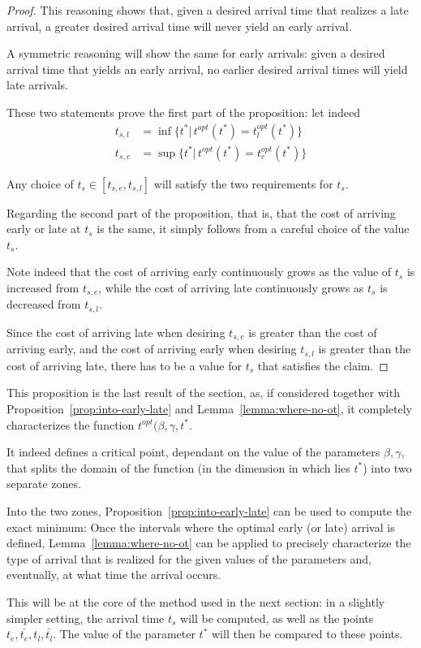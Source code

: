 \begin{proof}
  This reasoning shows that, given a desired arrival time that realizes a late arrival,
  a greater desired arrival time will never yield an early arrival.

  A symmetric reasoning will show the same for early arrivals:
  given a desired arrival time that yields an early arrival,
  no earlier desired arrival times will yield late arrivals.

  These two statements prove the first part of the proposition:
  let indeed
  \begin{align*}
    t_{s, l} & = \inf\{t^* |\, t^{opt}(t^*) = t_l^{opt}(t^*)\} \\
    t_{s, e} & = \sup\{t^* |\, t^{opt}(t^*) = t_e^{opt}(t^*)\}
  \end{align*}

  Any choice of \(t_s \in [t_{s, e}, t_{s, l}]\) will satisfy the two requirements for \(t_s\).

  Regarding the second part of the proposition,
  that is, that the cost of arriving early or late at \(t_s\) is the same,
  it simply follows from a careful choice of the value \(t_s\).

  Note indeed that the cost of arriving early continuously grows as the value of \(t_s\) is increased from \(t_{s, e}\),
  while the cost of arriving late continuously grows as \(t_s\) is decreased from \(t_{s, l}\).

  Since the cost of arriving late when desiring \(t_{s, e}\) is greater than the cost of arriving early,
  and the cost of arriving early when desiring \(t_{s, l}\) is greater than the cost of arriving late,
  there has to be a value for \(t_s\) that satisfies the claim.
\end{proof}

This proposition is the last result of the section,
as, if considered together with Proposition~\ref{prop:into-early-late} and Lemma~\ref{lemma:where-no-ot},
it completely characterizes the function \(t^{opt}(\beta, \gamma, t^*\).

It indeed defines a critical point,
dependant on the value of the parameters \(\beta, \gamma\),
that splits the domain of the function (in the dimension in which lies \(t^*\))
into two separate zones.

Into the two zones, Proposition~\ref{prop:into-early-late} can be used to compute the exact minimum:
Once the intervals where the optimal early (or late) arrival is defined,
Lemma~\ref{lemma:where-no-ot} can be applied to precisely characterize the type of arrival that is realized for the given values of the parameters and,
eventually, at what time the arrival occurs.

This will be at the core of the method used in the next section:
in a slightly simpler setting, the arrival time \(t_s\) will be computed,
as well as the points \(t_e, \bar{t_e}, t_l, \bar{t_l}\).
The value of the parameter \(t^*\) will then be compared to these points.

